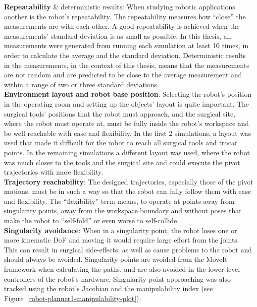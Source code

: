 \textbf{Repeatability} \& deterministic results: When studying robotic applications another is the robot’s repeatability. The repeatability measures how “close” the measurements are with each other. A good repeatability is achieved when the measurements' standard deviation is as small as possible. In this thesis, all measurements were generated from running each simulation at least 10 times, in order to calculate the average and the standard deviation. Deterministic results in the measurements, in the context of this thesis, means that the measurements are not random and are predicted to be close to the average measurement and within a range of two or three standard deviations.\\

\textbf{Environment layout and robot base position}: Selecting the robot's position in the operating room and setting up the objects’ layout is quite important. The surgical tools’ positions that the robot must approach, and the surgical site, where the robot must operate at, must be fully inside the robot's workspace and be well reachable with ease and flexibility. In the first 2 simulations, a layout was used that made it difficult for the robot to reach all surgical tools and trocar points. In the remaining simulations a different layout was used, where the robot was much closer to the tools and the surgical site and could execute the pivot trajectories with more flexibility.\\

\textbf{Trajectory reachability}: The designed trajectories, especially those of the pivot motions, must be  in such a way so that the robot can fully follow them with ease and flexibility. The “flexibility” term means, to operate at points away from singularity points, away from the workspace boundary and without poses that make the robot to “self-fold” or even worse to self-collide.\\

\textbf{Singularity avoidance}: When in a singularity point, the robot loses one or more kinematic DoF and moving it would require large effort from the joints. This can result in surgical side-effects, as well as cause problems to the robot and should always be avoided. Singularity points are avoided from the MoveIt framework when calculating the paths, and are also avoided in the lower-level controllers of the robot’s  hardware. Singularity point approaching was also tracked using the robot’s Jacobian and the manipulability index (see Figure~\ref{robot-planner1-manipulability-plot}).\\

